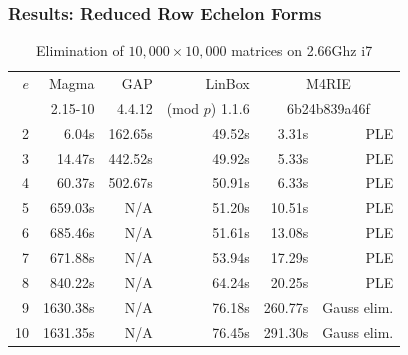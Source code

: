 \documentclass[11pt]{beamer}
\begin{document}
\begin{frame}[allowframebreaks]
\frametitle{Results: Reduced Row Echelon Forms}
\begin{table}[ht]
\begin{small}
\begin{center}
\begin{tabular}{|r|r|r|r|r|r|}
\hline
 $e$ & Magma & GAP & LinBox & \multicolumn{2}{c|}{M4RIE}   \\
     & {\footnotesize 2.15-10} & {\footnotesize 4.4.12} & (mod $p$) 1.1.6 & \multicolumn{2}{c|}{\footnotesize 6b24b839a46f}\\
\hline
  2 &    6.04s &  162.65s & 49.52s &   3.31s & PLE\\
  3 &   14.47s &  442.52s & 49.92s &   5.33s & PLE\\
  4 &   60.37s &  502.67s & 50.91s &   6.33s & PLE\\
  5 &  659.03s &      N/A & 51.20s &  10.51s & PLE\\
  6 &  685.46s &      N/A & 51.61s &  13.08s & PLE\\
  7 &  671.88s &      N/A & 53.94s &  17.29s & PLE\\
  8 &  840.22s &      N/A & 64.24s &  20.25s & PLE\\
\hline
  9 & 1630.38s &      N/A & 76.18s & 260.77s & Gauss elim.\\
 10 & 1631.35s &      N/A & 76.45s & 291.30s & Gauss elim.\\
\hline
\end{tabular}
\end{center}
\end{small}
\caption{Elimination of $10,000 \times 10,000$ matrices on 2.66Ghz i7}
\label{tab:echelonform}
\end{table}



\end{frame}
\end{document}
